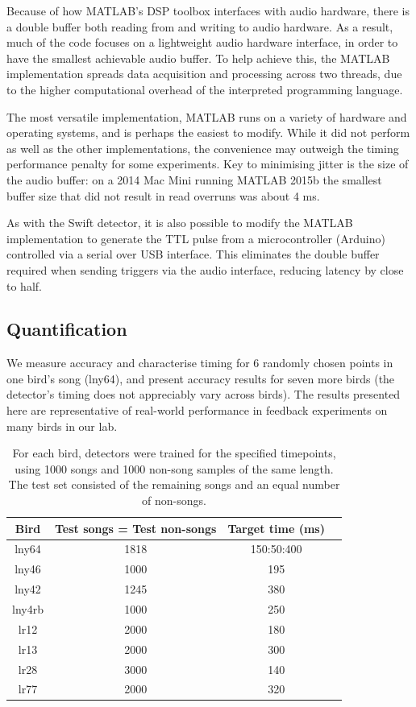 \documentclass[10pt,letterpaper]{article}
\begin{document}
Because of how MATLAB's DSP toolbox interfaces with audio hardware,
there is a double buffer both reading from and writing to audio
hardware. As a result, much of the code focuses on a lightweight audio
hardware interface, in order to have the smallest achievable audio
buffer. To help achieve this, the MATLAB implementation spreads data
acquisition and processing across two threads, due to the higher
computational overhead of the interpreted programming language.

The most versatile implementation, MATLAB runs on a variety of
hardware and operating systems, and is perhaps the easiest to modify.
While it did not perform as well as the other
implementations, the convenience may outweigh the timing
performance penalty for some experiments.  Key to minimising jitter is
the size of the audio buffer: on a 2014 Mac Mini running MATLAB 2015b
the smallest buffer size that did not result in read overruns was
about 4 ms.

As with the Swift detector, it is also possible to modify the
MATLAB implementation to generate the TTL pulse from a microcontroller
(Arduino) controlled via a serial over USB interface. This eliminates
the double buffer required when sending triggers via the audio
interface, reducing latency by close to half.

\subsection{Quantification}
\label{sec:quantify}

We measure accuracy and characterise timing for 6 randomly chosen
points in one bird's song (lny64), and present accuracy results for
seven more birds (the detector's timing does not appreciably vary across
birds). The results presented here are representative of real-world
performance in feedback experiments on many birds in our lab.


\begin{table}
 \begin{tabular}{c|ccc}
    Bird & Test songs = Test non-songs & Target time (ms) \\ \hline
    lny64 & 1818 & 150:50:400 \\
    lny46 & 1000 & 195 \\
    lny42 & 1245 & 380 \\
    lny4rb & 1000 & 250 \\
    lr12 & 2000 & 180 \\
    lr13 & 2000 & 300 \\
    lr28 & 3000 & 140 \\
    lr77 & 2000 & 320
  \end{tabular}
  \caption{For each bird, detectors were trained for the specified
    timepoints, using 1000 songs and 1000 non-song samples of the same
    length. The test set consisted of the remaining songs and an
    equal number of non-songs.}
  \label{table:datasizes}
\end{table}
\end{document}

